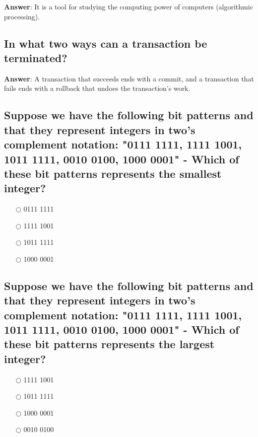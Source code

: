 \documentclass[a4paper,11pt,oneside]{article}
\begin{document}
\begin{sloppypar}
\label{q:345:sa:en:True}

\textbf{Answer}: It is a tool for studying the computing power of computers (algorithmic processing).



\subsection{In what two ways can a transaction be terminated?}

\label{q:346:sa:en:True}

\textbf{Answer}: A transaction that succeeds ends with a commit, and a transaction that fails ends with a rollback that undoes the transaction's work.



\subsection{Suppose we have the following bit patterns and that they represent integers in two's complement notation: "0111 1111, 1111 1001, 1011 1111, 0010 0100, 1000 0001" - Which of these bit patterns represents the smallest integer?}

\label{q:34800:mc:en:True}

\begin{itemize}
  \item[$\bigcirc$] 0111 1111
  \item[$\bigcirc$] 1111 1001
  \item[$\bigcirc$] 1011 1111
  \item[$\bigcirc$] 1000 0001
\end{itemize}

\subsection{Suppose we have the following bit patterns and that they represent integers in two's complement notation: "0111 1111, 1111 1001, 1011 1111, 0010 0100, 1000 0001" - Which of these bit patterns represents the largest integer?}

\label{q:3480001:mc:en:True}

\begin{itemize}
  \item[$\bigcirc$] 1111 1001
  \item[$\bigcirc$] 1011 1111
  \item[$\bigcirc$] 1000 0001
  \item[$\bigcirc$] 0010 0100
\end{itemize}




\end{sloppypar}
\end{document}
